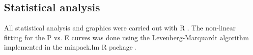 \subsection{Statistical analysis}

All statistical analysis and graphics were carried out with R \DIFdelbegin {}\DIFdelend \DIFaddbegin {}\DIFaddend . The non-linear fitting for the P vs. E curves was done using the Levenberg-Marquardt algorithm implemented in the minpack.lm R package \citep{Elzhov2013}\DIFaddbegin {}\DIFaddend .